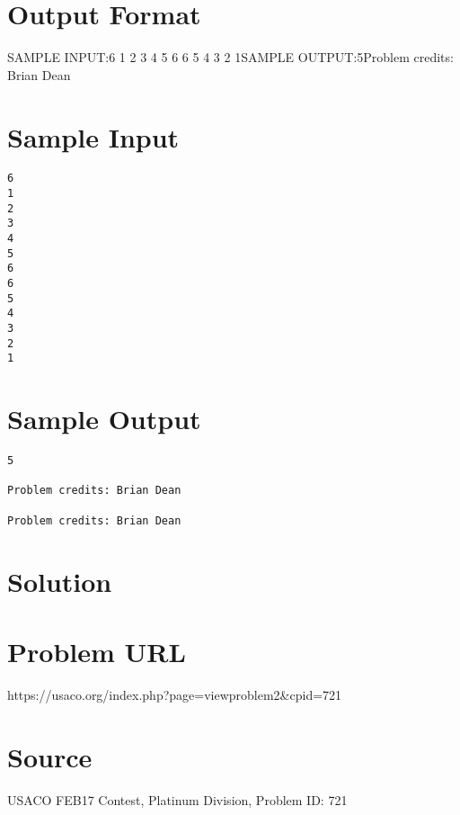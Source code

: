 \documentclass[12pt]{article}
\begin{document}
\section*{Output Format}
SAMPLE INPUT:6
1
2
3
4
5
6
6
5
4
3
2
1SAMPLE OUTPUT:5Problem credits: Brian Dean

\section*{Sample Input}
\begin{verbatim}
6
1
2
3
4
5
6
6
5
4
3
2
1
\end{verbatim}

\section*{Sample Output}
\begin{verbatim}
5

Problem credits: Brian Dean

Problem credits: Brian Dean
\end{verbatim}

\section*{Solution}


\section*{Problem URL}
https://usaco.org/index.php?page=viewproblem2&cpid=721

\section*{Source}
USACO FEB17 Contest, Platinum Division, Problem ID: 721
\end{document}
